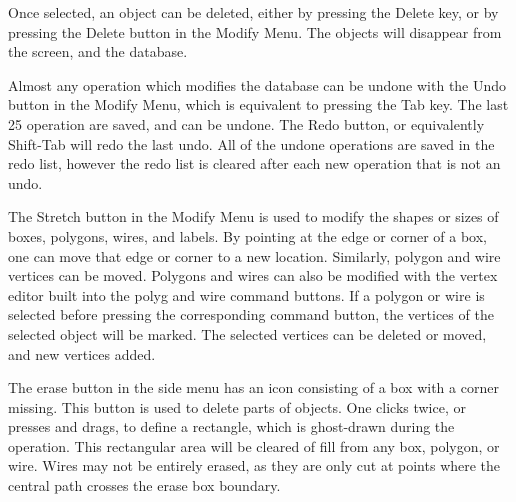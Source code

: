 Once selected, an object can be deleted, either by pressing the {\kb
Delete} key, or by pressing the {\cb Delete} button in the {\cb Modify
Menu}.  The objects will disappear from the screen, and the database.

Almost any operation which modifies the database can be undone with
the {\cb Undo} button in the {\cb Modify Menu}, which is equivalent to
pressing the {\kb Tab} key.  The last 25 operation are saved, and can
be undone.  The {\cb Redo} button, or equivalently {\kb Shift-Tab}
will redo the last undo.  All of the undone operations are saved in
the redo list, however the redo list is cleared after each new
operation that is not an undo.

The {\cb Stretch} button in the {\cb Modify Menu} is used to modify the
shapes or sizes of boxes, polygons, wires, and labels.  By pointing at
the edge or corner of a box, one can move that edge or corner to a new
location.  Similarly, polygon and wire vertices can be moved. 
Polygons and wires can also be modified with the vertex editor built
into the {\cb polyg} and {\cb wire} command buttons.  If a polygon or
wire is selected before pressing the corresponding command button, the
vertices of the selected object will be marked.  The selected vertices
can be deleted or moved, and new vertices added.

The {\cb erase} button in the side menu has an icon consisting of a
box with a corner missing.  This button is used to delete parts of
objects.  One clicks twice, or presses and drags, to define a
rectangle, which is ghost-drawn during the operation.  This
rectangular area will be cleared of fill from any box, polygon, or
wire.  Wires may not be entirely erased, as they are only cut at
points where the central path crosses the erase box boundary.

